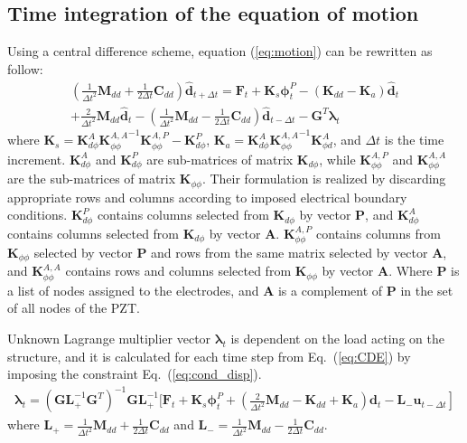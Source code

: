 \documentclass[materials,article,submit,moreauthors,pdftex]{Definitions/mdpi}
\begin{document}
{\subsection{Time integration of the equation of motion}
\label{sec:time_integration}
Using a central difference scheme, equation (\ref{eq:motion}) can be rewritten as follow:
\begin{eqnarray}
\left(\frac{1}{\Delta t^2}\textbf{M}_{dd}+\frac{1}{2\Delta t}\textbf{C}_{dd} \right)\widehat{\textbf{d}}_{t+\Delta t}=
\textbf{F}_t+\textbf{K}_s\boldsymbol{\phi}_t^P-\left( \textbf{K}_{dd}-\textbf{K}_a\right)\widehat{\textbf{d}}_t\nonumber\\
+\frac{2}{\Delta t^2}\textbf{M}_{dd}\widehat{\textbf{d}}_t-\left(\frac{1}{\Delta t^2}\textbf{M}_{dd}-\frac{1}{2\Delta t}\textbf{C}_{dd}\right)\widehat{\textbf{d}}_{t-\Delta t}-\textbf{G}^T\boldsymbol{\lambda}_t
\label{eq:CDE}
\end{eqnarray}
where  \(\textbf{K}_s=\textbf{K}_{d\phi}^A{\textbf{K}_{\phi \phi}^{A,A}}^{-1}\textbf{K}_{\phi \phi}^{A,P}-\textbf{K}_{d\phi}^P\), \(\textbf{K}_a=\textbf{K}_{d \phi}^A{\textbf{K}_{\phi \phi}^{A,A}}^{-1}\textbf{K}_{\phi d}^A\), and \(\Delta t\) is the time increment.
\(\textbf{K}_{d \phi}^A\) and \(\textbf{K}_{d\phi}^P\) are sub-matrices of matrix \(\textbf{K}_{d\phi}\), while \(\textbf{K}_{\phi \phi}^{A,P}\) and \(\textbf{K}_{\phi \phi}^{A,A}\) are the sub-matrices of matrix \(\textbf{K}_{\phi \phi}\).
Their formulation is realized by discarding appropriate rows and columns according to imposed electrical boundary conditions.
\(\textbf{K}_{d \phi}^P\) contains columns selected from \(\textbf{K}_{d\phi}\) by vector \textbf{P}, and \(\textbf{K}_{d\phi}^A\) contains columns selected from \(\textbf{K}_{d\phi}\) by vector \textbf{A}.
\(\textbf{K}_{\phi \phi}^{A,P}\) contains columns from \(\textbf{K}_{\phi \phi}\) selected by vector \textbf{P} and rows from the same matrix selected by vector \textbf{A}, and \(\textbf{K}_{\phi \phi}^{A,A}\) contains rows and columns selected from \(\textbf{K}_{\phi \phi}\) by vector \textbf{A}.
Where \textbf{P} is a list of nodes assigned to the electrodes, and \textbf{A} is a complement of \textbf{P} in the set of all nodes of the PZT.

Unknown Lagrange multiplier vector \(\boldsymbol{\lambda}_t\) is dependent on the load acting on the structure, and it is calculated for each time step from Eq.~(\ref{eq:CDE}) by imposing the constraint Eq.~(\ref{eq:cond_disp}).
\begin{eqnarray}
\boldsymbol{\lambda}_t = {\left(\textbf{G}\textbf{L}_+^{-1}\textbf{G}^T \right)}^{-1}\textbf{G}\textbf{L}_+^{-1} \Bigg[ \textbf{F}_t+\textbf{K}_s\boldsymbol{\phi}_t^P+\left.\left(\frac{2}{\Delta t^2}\textbf{M}_{dd}-\textbf{K}_{dd}+\textbf{K}_a\right)\textbf{d}_t -\textbf{L}_-\textbf{u}_{t-\Delta t} \right]
\end{eqnarray}
where \(\textbf{L}_+=\frac{1}{\Delta t^2}\textbf{M}_{dd}+\frac{1}{2\Delta t}\textbf{C}_{dd}\) and \(\textbf{L}_-=\frac{1}{\Delta t^2}\textbf{M}_{dd}-\frac{1}{2\Delta t}\textbf{C}_{dd}\).

}
\end{document}
